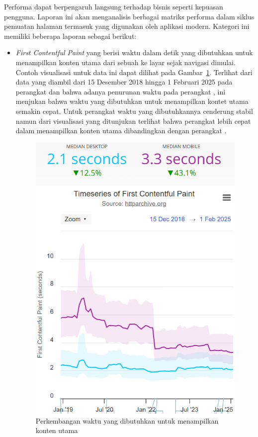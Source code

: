 Performa \web dapat berpengaruh langsung terhadap bisnis seperti kepuasan pengguna. Laporan ini akan menganalisis berbagai matriks performa dalam siklus pemuatan halaman \web termasuk yang digunakan oleh aplikasi \web modern. Kategori ini memiliki beberapa laporan sebagai berikut:
\begin{itemize}
    \item \textit{First Contentful Paint} yang berisi waktu dalam detik yang dibutuhkan untuk menampilkan konten utama dari sebuah \web ke layar sejak navigasi dimulai. Contoh visualisasi untuk data ini dapat dilihat pada Gambar~\ref{fig:firstcontent}. Terlihat dari data yang diambil dari 15 Desember 2018 hingga 1 Februari 2025 pada perangkat \desktop dan \mobile bahwa adanya penurunan waktu pada perangkat \mobile, ini menjukan bahwa waktu yang dibutuhkan untuk menampilkan kontet utama semakin cepat. Untuk perangkat \desktop waktu yang dibutuhkannya cenderung stabil namun dari visualisasi yang ditunjukan terlihat bahwa perangkat \desktop lebih cepat dalam menampilkan konten utama dibandingkan dengan perangkat \mobile.   
    \begin{figure}[H]
        \centering
        \includegraphics[width=0.4\linewidth]{Gambar/Contoh First Content.png}
        \caption{Perkembangan waktu yang dibutuhkan untuk menampilkan konten utama}
        \label{fig:firstcontent}
    \end{figure}


\end{itemize}
